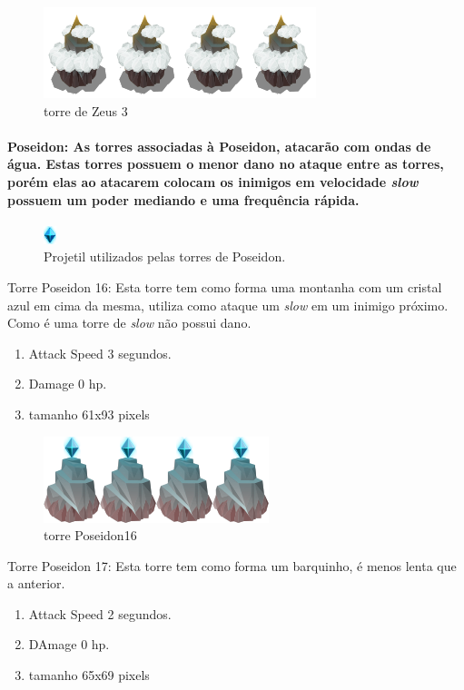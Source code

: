 \documentclass[11pt]{article} %
\begin{document}
\begin{figure}[!htp]
\centering
\includegraphics[scale=1.3]{res/towers/tower_3.png}
\caption{torre de Zeus 3}
\end{figure}

\newpage

\paragraph{{\Large Poseidon}: As torres associadas à Poseidon, atacarão com ondas de água. Estas torres possuem o menor dano no ataque entre as torres, porém elas ao atacarem colocam os inimigos em velocidade \textit{slow} possuem um poder mediando e uma frequência rápida.}

\begin{figure}[!htp]
\centering
\includegraphics[scale=1]{res/projectiles/projetil_poseidon.png}
\caption{Projetil utilizados pelas torres de Poseidon.}
\end{figure}

Torre Poseidon 16: Esta torre tem como forma uma montanha com um cristal azul em cima da mesma, utiliza como ataque um \textit{slow} em um inimigo próximo. Como é uma torre de \textit{slow} não possui dano.
\begin{enumerate}
\item Attack Speed 3 segundos.
\item Damage 0 hp.
\item tamanho 61x93 pixels
\end{enumerate}

\begin{figure}[!htp]
\centering
\includegraphics[scale=1]{res/towers/tower_16.png}
\caption{torre Poseidon16}
\end{figure}

Torre Poseidon 17: Esta torre tem como forma um barquinho, é menos lenta que a anterior.
\begin{enumerate}
\item Attack Speed 2 segundos.
\item DAmage 0 hp.
\item tamanho 65x69 pixels
\end{enumerate}
\end{document}
